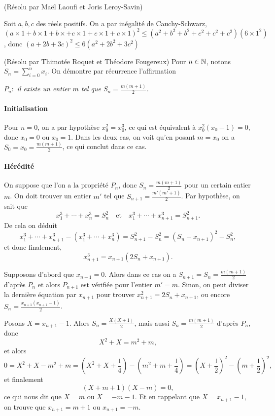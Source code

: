 \begin{sol}[80](Résolu par Maël Laoufi et Joris Leroy-Savin)

Soit $a,b,c$ des r\'eels positifs. On a par in\'egalit\'e de Cauchy-Schwarz,\\
$(a \times 1+ b\times 1+b \times+ c\times 1+c \times 1 +c\times 1)^2 \leq (a^2+b^2+b^2+c^2+c^2+c^2)(6 \times 1^2)$,
donc $(a+2b+3c)^2 \leq 6(a^2+2b^2+3c^2)$



\end{sol}

\begin{sol}[82](R\'esolu par Thimot\'ee Roquet et Th\'eodore Fougereux)
Pour $n\in\mathbb{N}$, notons $S_n=\sum_{i=0}^n x_i$. On d\'emontre par r\'ecurrence l'affirmation
\begin{center}
$P_n:$ {\it il existe un entier $m$ tel que $S_n=\frac{m(m+1)}{2}$.}
\end{center} 

\paragraph*{Initialisation} Pour $n=0$, on a par hypoth\`ese $x_0^2=x_0^3$, ce qui est \'equivalent \`a $x_0^2(x_0-1)=0$, donc $x_0=0$ ou $x_0=1$. Dans les deux cas, on voit qu'en posant $m=x_0$ on a $S_0=x_0=\frac{m(m+1)}{2}$, ce qui conclut dans ce cas.

\paragraph*{H\'er\'edit\'e} On suppose que l'on a la propri\'et\'e $P_n$, donc $S_n=\frac{m(m+1)}{2}$ pour un certain entier $m$. On doit trouver un entier $m'$ tel que $S_{n+1}=\frac{m'(m'+1)}{2}$. Par hypoth\`ese, on sait que
\[x_1^3+\cdots+x_n^3=S_n^2\quad\text{et}\quad x_1^3+\cdots+x_{n+1}^3=S_{n+1}^2.\]
De cela on d\'eduit
\[x_1^3+\cdots+x_{n+1}^3-(x_1^3+\cdots+x_{n}^3)=S_{n+1}^2-S_n^2=(S_n+x_{n+1})^2-S_n^2,\]
et donc finalement,
\[x_{n+1}^3=x_{n+1}(2S_n+x_{n+1}).\]

Supposons d'abord que $x_{n+1}=0$. Alors dans ce cas on a $S_{n+1}=S_n=\frac{m(m+1)}{2}$ d'apr\`es $P_n$ et alors $P_{n+1}$ est v\'erifi\'ee pour l'entier $m'=m$. Sinon, on peut diviser la derni\`ere \'equation par $x_{n+1}$ pour trouver $x_{n+1}^2=2S_n+x_{n+1}$, ou encore $S_n=\frac{x_{n+1}(x_{n+1}-1)}{2}$.

Posons $X=x_{n+1}-1$. Alors $S_n=\frac{X(X+1)}{2}$, mais aussi $S_n=\frac{m(m+1)}{2}$ d'apr\`es  $P_n$, donc \[X^2+X=m^2+m,\]
et alors
\[0=X^2+X -m^2+m=\left(X^2+X+\frac14\right) -\left(m^2+m+\frac14\right)=\left(X+\frac12\right)^2-\left(m+\frac12\right)^2,\]
et finalement
\[(X+m+1)(X-m)=0,\]
ce qui nous dit que $X=m$ ou $X=-m-1$. Et en rappelant que $X=x_{n+1}-1$, on trouve que $x_{n+1}=m+1$ ou $x_{n+1}=-m$.


\end{sol}
